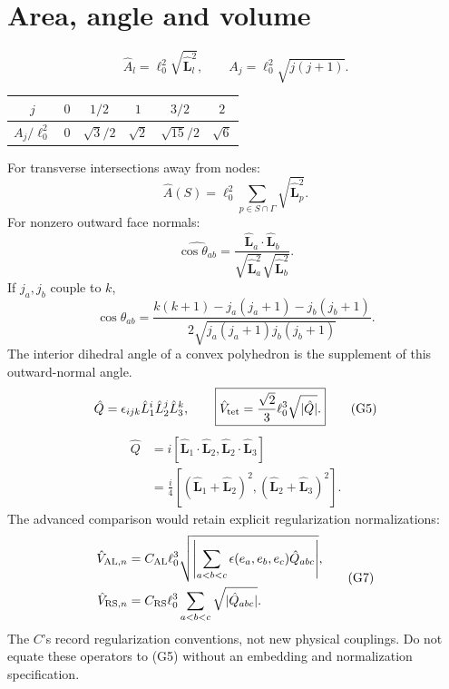 \documentclass[11pt,a4paper]{article}
\newcommand{\eq}[2]{\begin{equation}#2\tag{#1}\end{equation}}
\begin{document}
\section{Area, angle and volume}
\eq{G1}{\hat A_l=\ell_0^2\sqrt{\hat{\mathbf L}_l^2},\qquad A_j=\ell_0^2\sqrt{j(j+1)}.}
\begin{center}\begin{tabular}{c|ccccc}$j$&$0$&$1/2$&$1$&$3/2$&$2$\\\hline
$A_j/\ell_0^2$&$0$&$\sqrt3/2$&$\sqrt2$&$\sqrt{15}/2$&$\sqrt6$\end{tabular}\end{center}
For transverse intersections away from nodes:
\eq{G2}{\hat A(S)=\ell_0^2\sum_{p\in S\cap\Gamma}\sqrt{\hat{\mathbf L}_p^2}.}
For nonzero outward face normals:
\eq{G3}{\widehat{\cos\theta_{ab}}=\frac{\hat{\mathbf L}_a\cdot\hat{\mathbf L}_b}{\sqrt{\hat{\mathbf L}_a^2}\sqrt{\hat{\mathbf L}_b^2}}.}
If $j_a,j_b$ couple to $k$,
\eq{G4}{\cos\theta_{ab}=\frac{k(k+1)-j_a(j_a+1)-j_b(j_b+1)}{2\sqrt{j_a(j_a+1)j_b(j_b+1)}}.}
The interior dihedral angle of a convex polyhedron is the supplement of this outward-normal angle.
\eq{G5}{\hat Q=\epsilon_{ijk}\hat L_1^i\hat L_2^j\hat L_3^k,\qquad\boxed{\hat V_{\rm tet}=\frac{\sqrt2}{3}\ell_0^3\sqrt{|\hat Q|}.}}
\eq{G6}{\begin{aligned}
\hat Q&=i[\hat{\mathbf L}_1\cdot\hat{\mathbf L}_2,\hat{\mathbf L}_2\cdot\hat{\mathbf L}_3]\\
&=\frac i4[(\hat{\mathbf L}_1+\hat{\mathbf L}_2)^2,(\hat{\mathbf L}_2+\hat{\mathbf L}_3)^2].
\end{aligned}}
The advanced comparison would retain explicit regularization normalizations:
\eq{G7}{\begin{aligned}
\hat V_{{\rm AL},n}&=C_{\rm AL}\ell_0^3\sqrt{\left|\sum_{a<b<c}\epsilon(e_a,e_b,e_c)\hat Q_{abc}\right|},\\
\hat V_{{\rm RS},n}&=C_{\rm RS}\ell_0^3\sum_{a<b<c}\sqrt{|\hat Q_{abc}|}.
\end{aligned}}
The $C$'s record regularization conventions, not new physical couplings. Do not equate these operators to (G5) without an embedding and normalization specification.
\end{document}
